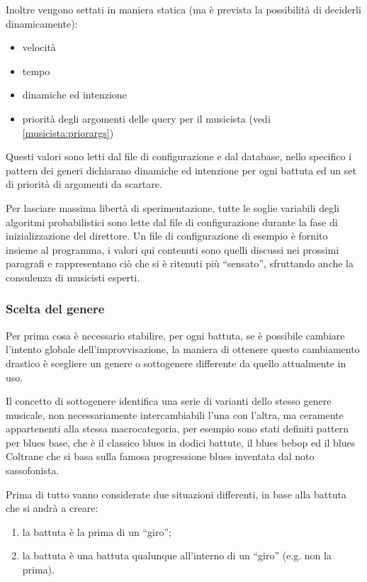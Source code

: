 \noindent
Inoltre vengono settati in maniera statica (ma è prevista la possibilità di deciderli dinamicamente):
\begin{itemize}
\item velocità
\item tempo
\item dinamiche ed intenzione
\item priorità degli argomenti delle query per il musicista (vedi \ref{musicista:priorargs}) %
\end{itemize}

Questi valori sono letti dal file di configurazione e dal database, nello specifico i pattern dei generi dichiarano dinamiche ed intenzione per ogni battuta ed un set di priorità di argomenti da scartare.

Per lasciare massima libertà di sperimentazione, tutte le soglie variabili degli algoritmi probabilistici sono lette dal file di configurazione durante la fase di inizializzazione del direttore.
Un file di configurazione di esempio è fornito insieme al programma, i valori qui contenuti sono quelli discussi nei prossimi paragrafi e rappresentano ciò che si è ritenuti più ``sensato'', sfruttando anche la consulenza di musicisti esperti. %

\subsubsection{Scelta del genere}
Per prima cosa è necessario stabilire, per ogni battuta, se è possibile cambiare l'intento globale dell'improvvisazione, la maniera di ottenere questo cambiamento drastico è scegliere un genere o sottogenere differente da quello attualmente in uso.

Il concetto di sottogenere identifica una serie di varianti dello stesso genere musicale, non necessariamente intercambiabili l'una con l'altra, ma ceramente appartenenti alla stessa macrocategoria, per esempio sono stati definiti pattern per blues base, che è il classico blues in dodici battute, il blues bebop ed il blues Coltrane che si basa sulla famosa progressione blues inventata dal noto sassofonista.

Prima di tutto vanno considerate due situazioni differenti, in base alla battuta che si andrà a creare:
\begin{enumerate}
\item la battuta è la prima di un ``giro'';
\item la battuta è una battuta qualunque all'interno di un ``giro'' (e.g. non la prima).
\end{enumerate}

